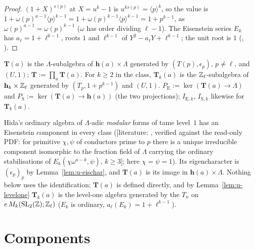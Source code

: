 \documentclass[11pt]{article}
\newcommand{\LIT}[1]{\textsf{[literature: #1]}}   %
\newcommand{\Iw}{\Lambda}                         %
\newcommand{\hcusp}{\mathbf{h}}                   %
\newcommand{\Tu}{\mathbf{T}}                      %
\newcommand{\Eis}{\mathrm{E}}
\newcommand{\cusp}{\mathrm{S}}
\newcommand{\ee}{\epsilon}                        %
\newcommand{\Zl}{\Z_\ell}
\begin{document}
\begin{proof}
$(1+X)^{s(p)}$ at $X=u^{k}-1$ is $u^{ks(p)}=\langle p\rangle^{k}$, so the value is
$1+\omega(p)^{a-1}\langle p\rangle^{k-1}=1+\omega(p)^{k-1}\langle p\rangle^{k-1}=1+p^{k-1}$, as $\omega(p)^{a-1}=\omega(p)^{k-1}$
($\omega$ has order dividing $\ell-1$). The Eisenstein series $E_k$ has $a_\ell=1+\ell^{k-1}$, roots $1$ and $\ell^{k-1}$ of
$Y^{2}-a_\ell Y+\ell^{k-1}$; the unit root is $1$ (, ).
\end{proof}

\begin{definition}\label{def:u-T}
$\Tu(a)$ is the $\Iw$-subalgebra of $\hcusp(a)\times\Iw$ generated by $(T(p),\ee_p)$, $p\ne\ell$, and $(U,1)$; $\Tu:=\prod_a\Tu(a)$.
For $k\ge2$ in the class, $\Tu_k(a)$ is the $\Zl$-subalgebra of $\hcusp_k\times\Zl$ generated by $(T_p,1+p^{k-1})$ and $(U,1)$.
$P_\Eis:=\ker(\Tu(a)\to\Iw)$ and $P_\cusp:=\ker(\Tu(a)\to\hcusp(a))$ (the two projections); $I_{\Eis,k}$, $I_{\cusp,k}$ likewise
for $\Tu_k(a)$.
\end{definition}

\begin{remark}\label{rmk:u-hidaM}
Hida's ordinary algebra of $\Iw$-adic \emph{modular} forms of tame level~$1$ has an Eisenstein component in every class
(\LIT{\cite[Thm.~7.2, p.~272]{hida_ens}, verified against the read-only PDF: for primitive $\chi,\psi$ of conductors prime to
$p$ there is a unique irreducible component isomorphic to the fraction field of $\Iw$ carrying the ordinary stabilisations of
$E_k(\chi\omega^{a-k},\psi)$, $k\ge3$}; here $\chi=\psi=1$). Its eigencharacter is $(\ee_p)_p$ by Lemma~\ref{lem:u-eischar}, and
$\Tu(a)$ is its image in $\hcusp(a)\times\Iw$. Nothing below uses the identification; $\Tu(a)$ is defined directly, and by
Lemma~\ref{lem:u-levelone} $\Tu_k(a)$ is the level-one algebra generated by the $T_n$ on $e\,M_k(\SL_2(\Z);\Zl)$
($E_k$ is ordinary, $a_\ell(E_k)=1+\ell^{k-1}$).
\end{remark}

\section{Components}\label{sec:u-comp}
\end{document}
